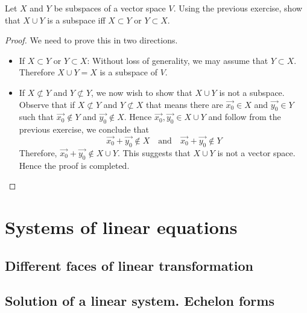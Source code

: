 \begin{exercise}
  Let $X$ and $Y$ be subspaces of a vector space $V$. Using the previous
  exercise, show that $X\cup Y$ is a subspace iff $X\subset Y$ or 
  $Y\subset X$.
\end{exercise}
\begin{proof}
  We need to prove this in two directions.
  \begin{itemize}
    \item If $X\subset Y$ or $Y\subset X$: Without loss of generality, 
      we may assume that $Y\subset X$. Therefore $X\cup Y=X$ is a 
      subspace of $V$.
    \item If $X\not\subset Y$ and $Y\not\subset Y$, we now wish to show that
      $X\cup Y$ is not a subspace. Observe that if
      $X\not\subset Y$ and $Y\not\subset X$ that means there are 
      $\vec{x_0}\in X$ and $\vec{y_0}\in Y$ such that $\vec{x_0}\notin Y$
      and $\vec{y_0}\notin X$. Hence $\vec{x_0},\vec{y_0}\in X\cup Y$ and
      follow from the previous exercise, we conclude that
      \[
        \vec{x_0}+\vec{y_0}\notin X
        \quad\text{and}\quad
        \vec{x_0}+\vec{y_0}\notin Y
      \]
      Therefore, $\vec{x_0}+\vec{y_0}\notin X\cup Y$. This suggests that
      $X\cup Y$ is not a vector space. Hence the proof is completed.
  \end{itemize}
\end{proof}

\chapter{Systems of linear equations}

\section{Different faces of linear transformation}
\section{Solution of a linear system. Echelon forms}

